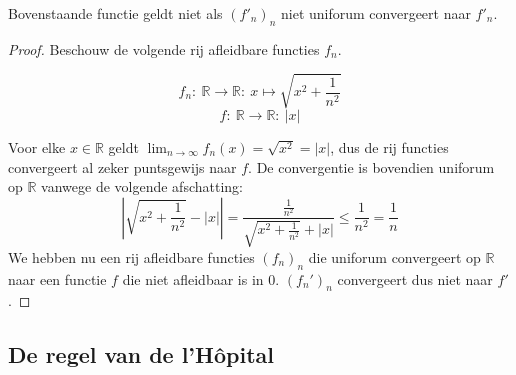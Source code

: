 \documentclass[main.tex]{subfiles}
\begin{document}
\begin{tvb}
  Bovenstaande functie geldt niet als $(f'_{n})_{n}$ niet uniforum convergeert naar $f'_{n}$.
  \begin{proof}
    Beschouw de volgende rij afleidbare functies $f_{n}$.

    \noindent
    \begin{minipage}{.45\textwidth}
    \begin{figure}[H]
      \centering
    \end{figure}
    \end{minipage}
    \begin{minipage}{.45\textwidth}
    \[ f_{n}:\ \mathbb{R} \rightarrow \mathbb{R}:\ x \mapsto \sqrt{x^{2}+ \frac{1}{n^{2}}} \]
    \[ f:\ \mathbb{R} \rightarrow \mathbb{R}:\ |x| \]
    \end{minipage}

    Voor elke $x\in \mathbb{R}$ geldt $\lim_{n\rightarrow \infty}f_{n}(x) = \sqrt{x^{2}} = |x|$, dus de rij functies convergeert al zeker puntsgewijs naar $f$.
    De convergentie is bovendien uniforum op $\mathbb{R}$ vanwege de volgende afschatting:
    \[
    \left| \sqrt{x^{2}+\frac{1}{n^{2}}} - |x| \right|
    = \frac{\frac{1}{n^{2}}}{\sqrt{x^{2}+\frac{1}{n^{2}}} + |x|}
    \le \frac{1}{n^{2}}
    = \frac{1}{n}
    \]
    We hebben nu een rij afleidbare functies $(f_{n})_{n}$ die uniforum convergeert op $\mathbb{R}$ naar een functie $f$ die niet afleidbaar is in $0$.
    $(f_{n}')_{n}$ convergeert dus niet naar $f'$.
  \end{proof}
\end{tvb}

\subsection{De regel van de l'H\^opital}
\label{sec:de-regel-van-de-hopital}
\end{document}
